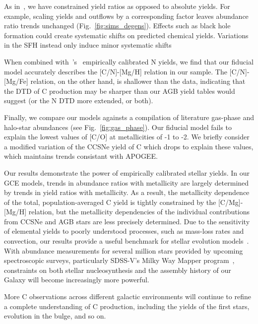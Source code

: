 \documentclass[fleqn,
usenatbib]{mnras}
\begin{document}
As in~\citet{james+23}, we have constrained yield ratios as opposed to absolute yields. For example, scaling yields and outflows by a corresponding factor leaves abundance ratio trends unchanged (Fig.~\ref{fig:sims_degens}).  Effects such as black hole formation could create systematic shifts on predicted chemical yields.
Variations in the SFH instead only induce minor systematic shifts


When combined with~\citeauthor{james+23}'s~\citeyearpar{james+23} empirically calibrated N yields, we find that our fiducial model accurately describes the [C/N]-[Mg/H] relation in our sample. The [C/N]-[Mg/Fe] relation, on the other hand, is shallower than the data, indicating that the DTD of C production may be sharper than our AGB yield tables would suggest (or the N DTD more extended, or both).

Finally, we compare our models againsts a compilation of literature gas-phase and halo-star abundances (see Fig.~\ref{fig:gas_phase}). Our fiducial model fails to explain the lowest values of [C/O] at metallicities of -1 to -2. We briefly consider a modified variation of the CCSNe yield of C which drops to explain these values, which maintains trends consistant with APOGEE. 


Our results demonstrate the power of empirically calibrated stellar yields. In our GCE models, trends in abundance ratios with metallicity are largely determined by trends in yield ratios with metallicity. As a result, the metallicity dependence of the total, population-averaged C yield is tightly constrained by the [C/Mg]-[Mg/H] relation, but the metallicity dependencies of the individual contributions from CCSNe and AGB stars are less precisely determined. Due to the sensitivity of elemental yields to poorly understood processes, such as mass-loss rates and convection, our results provide a useful benchmark for stellar evolution models~\citep[see the discussion in e.g.][]{gil-pons+2022}. With abundance measurements for several million stars provided by upcoming spectroscopic surveys, particularly SDSS-V's Milky Way Mapper program~\citep{sdssv}, constraints on both stellar nucleosynthesis and the assembly history of our Galaxy will become increasingly more powerful.

More C observations across different galactic environments will continue to refine a complete understanding of C production, including the yields of the first stars,  evolution in the bulge, and so on. 
\end{document}
